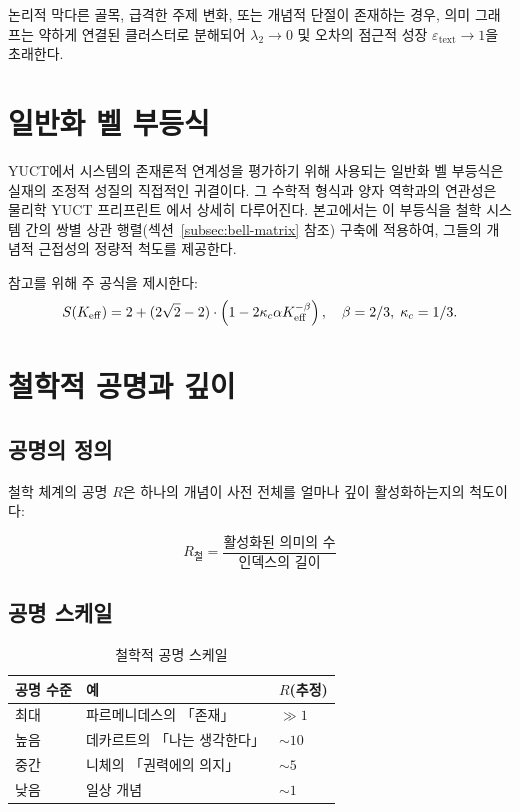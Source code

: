 \documentclass[11pt,a4paper]{article}
\newcommand{\kappac}{\kappa_c}
\newcommand{\betaf}{\beta}
\begin{document}
	논리적 막다른 골목, 급격한 주제 변화, 또는 개념적 단절이 존재하는 경우, 의미 그래프는 약하게 연결된 클러스터로 분해되어 \(\lambda_2 \to 0\) 및 오차의 점근적 성장 \(\varepsilon_{\text{text}} \to 1\)을 초래한다.
	
	\section{일반화 벨 부등식}
	
	YUCT에서 시스템의 존재론적 연계성을 평가하기 위해 사용되는 일반화 벨 부등식은 실재의 조정적 성질의 직접적인 귀결이다. 그 수학적 형식과 양자 역학과의 연관성은 물리학 YUCT 프리프린트 \cite{Yakushev2026b}에서 상세히 다루어진다. 본고에서는 이 부등식을 철학 시스템 간의 쌍별 상관 행렬(섹션~\ref{subsec:bell-matrix} 참조) 구축에 적용하여, 그들의 개념적 근접성의 정량적 척도를 제공한다.
	
	참고를 위해 주 공식을 제시한다:
	\[
	S(\Keff) = 2 + (2\sqrt{2} - 2) \cdot \left(1 - 2\kappac \alpha \Keff^{-\betaf}\right), \quad \betaf=2/3,\; \kappac=1/3.
	\]
	
	\section{철학적 공명과 깊이}
	
	\subsection{공명의 정의}
	
	철학 체계의 공명 \(R\)은 하나의 개념이 사전 전체를 얼마나 깊이 활성화하는지의 척도이다:
	
	\begin{equation}
		R_{\text{철}} = \frac{\text{활성화된 의미의 수}}{\text{인덱스의 길이}}
	\end{equation}
	
	\subsection{공명 스케일}
	
	\begin{table}[H]
		\centering
		\caption{철학적 공명 스케일}
		\begin{tabular}{p{4cm}p{5cm}p{5cm}}
			\toprule
			\textbf{공명 수준} & \textbf{예} & \textbf{\(R\)(추정)} \\
			\midrule
			최대 & 파르메니데스의 「존재」 & \(\gg 1\) \\
			높음 & 데카르트의 「나는 생각한다」 & \(\sim 10\) \\
			중간 & 니체의 「권력에의 의지」 & \(\sim 5\) \\
			낮음 & 일상 개념 & \(\sim 1\) \\
			\bottomrule
		\end{tabular}
	\end{table}
	
\end{document}
